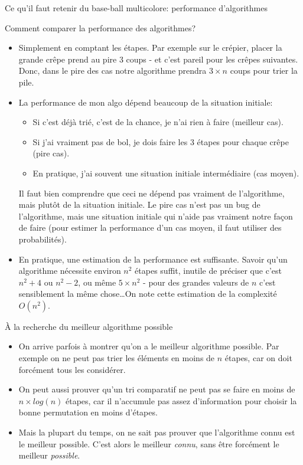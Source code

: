 \begin{frame}{Ce qu'il faut retenir du base-ball multicolore: performance d'algorithmes}
  \begin{block}{Comment comparer la performance des algorithmes?}
    \begin{itemize}
    \item Simplement en comptant les étapes. Par exemple sur le crépier, placer la grande crêpe prend au pire 3 coups - et c'est pareil pour les crêpes suivantes. Donc, dans le pire des cas notre algorithme prendra $3\times n$ coups pour trier la pile.
    \item La performance de mon algo dépend beaucoup de la situation initiale:
      \begin{itemize}
      \item Si c'est déjà trié, c'est de la chance, je n'ai rien à faire
        (\alert{meilleur cas}).
      \item Si j'ai vraiment pas de bol, je dois faire les 3 étapes pour chaque crêpe (\alert{pire cas}).
      \item En pratique, j'ai souvent une situation initiale intermédiaire (\alert{cas moyen}).
      \end{itemize}

      Il faut bien comprendre que ceci ne dépend pas vraiment de l'algorithme, mais plutôt de la situation initiale. Le pire cas n'est pas un bug de l'algorithme, mais une situation initiale qui n'aide pas vraiment notre façon de faire (pour estimer la performance d'un cas moyen, il faut utiliser des probabilités).
    \item En pratique, une estimation de la performance est suffisante. Savoir
      qu'un algorithme nécessite environ $n^2$ étapes suffit, inutile de préciser que c'est $n^2+4$ ou $n^2-2$, ou même $5\times n^2$ - pour des grandes valeurs de $n$ c'est sensiblement la même chose\ldots On note cette estimation de la complexité $O(n^2)$.
    \end{itemize}
  \end{block}

  \begin{block}{À la recherche du meilleur algorithme possible}
    \begin{itemize}
    \item On arrive parfois à montrer qu'on a le meilleur algorithme possible. Par exemple on ne peut pas trier les éléments en moins de $n$ étapes, car on doit forcément tous les considérer.
    \item On peut aussi prouver qu'un tri comparatif ne peut pas se faire en moins de $n\times log(n)$ étapes, car il n'accumule pas assez d'information pour choisir la bonne permutation en moins d'étapes.
    \item Mais la plupart du temps, on ne sait pas prouver que l'algorithme connu est le meilleur possible. C'est alors le meilleur \textit{connu}, sans être forcément le meilleur \textit{possible}.
    \end{itemize}
  \end{block}


\end{frame}
